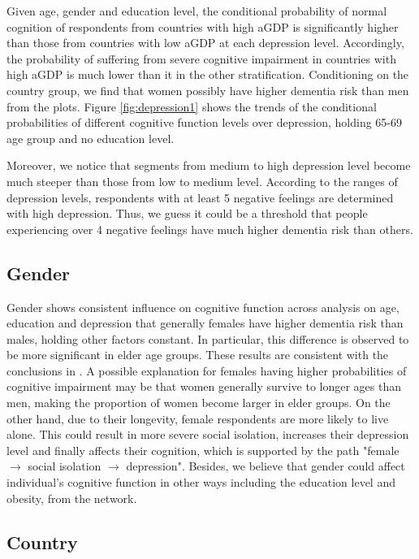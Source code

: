 \documentclass[11pt,twoside]{article}
\numberwithin{Theorem}{section}
\numberwithin{Definition}{section}
\numberwithin{Lemma}{section}
\numberwithin{Algorithm}{section}
\numberwithin{equation}{section}
\begin{document}
Given age, gender and education level, the conditional probability of normal cognition of respondents from countries with high aGDP is significantly higher than those from countries with low aGDP at each depression level. Accordingly, the probability of suffering from severe cognitive impairment in countries with high aGDP is much lower than it in the other stratification. Conditioning on the country group, we find that women possibly have higher dementia risk than men from the plots. Figure \ref{fig:depression1} shows the trends of the conditional probabilities of different cognitive function levels over depression, holding 65-69 age group and no education level.

Moreover, we notice that segments from medium to high depression level become much steeper than those from low to medium level. According to the ranges of depression levels, respondents with at least 5 negative feelings are determined with high depression. Thus, we guess it could be a threshold that people experiencing over 4 negative feelings have much higher dementia risk than others.

\subsection{Gender}

Gender shows consistent influence on cognitive function across analysis on age, education and depression that generally females have higher dementia risk than males, holding other factors constant. In particular, this difference is observed to be more significant in elder age groups. These results are consistent with the conclusions in \cite{beam2018differences}.  A possible explanation for females having higher probabilities of cognitive impairment may be that women generally survive to longer ages than men, making the proportion of women become larger in elder groups. On the other hand, due to their longevity, female respondents are more likely to live alone. This could result in more severe social isolation, increases their depression level and finally affects their cognition, which is supported by the path "female $\rightarrow$ social isolation $\rightarrow$ depression". Besides, we believe that gender could affect individual's cognitive function in other ways including the education level and obesity, from the network.

\subsection{Country}
\end{document}
